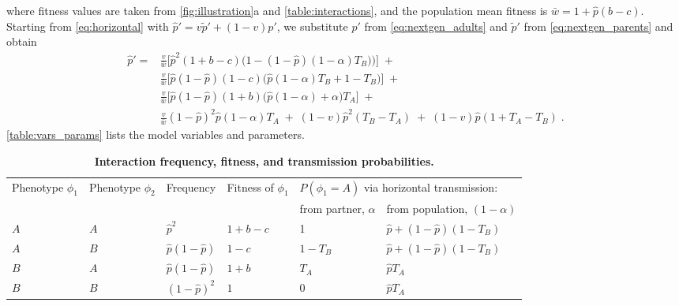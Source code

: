 \documentclass[12pt]{extarticle}
\begin{document}
where fitness values are taken from \autoref{fig:illustration}a and \autoref{table:interactions}, and the population mean fitness is
$\bar{w} =  1 + \hat{p}(b-c)$.
Starting from \autoref{eq:horizontal} with $\hat{p}'=v\tilde{p}'+(1-v)p'$, we substitute $p'$ from \autoref{eq:nextgen_adults} and $\tilde{p}'$ from \autoref{eq:nextgen_parents} and obtain
\begin{equation} \label{eq:nextgen_juveniles}
\begin{aligned}
\hat{p}' =
& \frac{v}{\bar{w}}\Big[\hat{p}^2(1+b-c)\Big(1-(1-\hat{p})(1-\alpha)T_B)\Big)\Big] \;+ \\
& \frac{v}{\bar{w}}\Big[ \hat{p}(1-\hat{p})(1-c)\big( \hat{p}(1-\alpha)T_B + 1 - T_B \big) \Big] \;+ \\
& \frac{v}{\bar{w}}\Big[ \hat{p}(1-\hat{p})(1+b)\big(\hat{p}(1-\alpha) + \alpha \big) T_A \Big] \;+ \\
& \frac{v}{\bar{w}}(1-\hat{p})^2\hat{p}(1-\alpha)T_A \;+\;
(1-v)\hat{p}^2(T_B-T_A) \;+\;
(1-v)\hat{p}(1+T_A-T_B) \;.
\end{aligned}
\end{equation}
\autoref{table:vars_params} lists the model variables and parameters.

\begin{table}[h]
  \caption{\textbf{Interaction frequency, fitness, and transmission probabilities.}}
  \begin{tabular}{@{}llllll@{}}
  \toprule
  \multirow{2}{*}{Phenotype $\phi_1$} &
    \multirow{2}{*}{Phenotype $\phi_2$} &
    \multirow{2}{*}{Frequency} &
    \multirow{2}{*}{Fitness of $\phi_1$} &
    \multicolumn{2}{l}{$P(\phi_1=A)$ via horizontal transmission:} \\ \cmidrule(l){5-6} 
      &     &                      &         & from partner, $\alpha$ & from population, $(1-\alpha)$ \\ \cmidrule(r){1-6}
  $A$ & $A$ & $\hat{p}^2$          & $1+b-c$ & 1                      & $\hat{p}+(1-\hat{p})(1-T_B)$  \\
  $A$ & $B$ & $\hat{p}(1-\hat{p})$ & $1-c$   & $1-T_B$                & $\hat{p}+(1-\hat{p})(1-T_B)$  \\
  $B$ & $A$ & $\hat{p}(1-\hat{p})$ & $1+b$   & $T_A$                  & $\hat{p} T_A$                 \\
  $B$ & $B$ & $(1-\hat{p})^2$      & $1$     & $0$                    & $\hat{p} T_A$                 \\ \bottomrule
  \end{tabular}
  \label{table:interactions}
\end{table}
\bigskip
\end{document}
